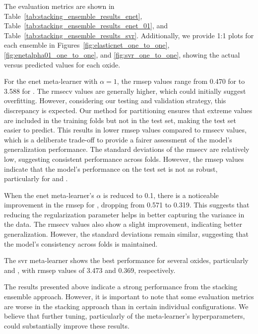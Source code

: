 The evaluation metrics are shown in Table~\ref{tab:stacking_ensemble_results_enet}, Table~\ref{tab:stacking_ensemble_results_enet_01}, and Table~\ref{tab:stacking_ensemble_results_svr}.
Additionally, we provide 1:1 plots for each ensemble in Figures~\ref{fig:elasticnet_one_to_one}, \ref{fig:enetalpha01_one_to_one}, and \ref{fig:svr_one_to_one}, showing the actual versus predicted values for each oxide.

For the \gls{enet} meta-learner with $\alpha = 1$, the \gls{rmsep} values range from 0.470 for  to 3.588 for .
The \gls{rmsecv} values are generally higher, which could initially suggest overfitting.
However, considering our testing and validation strategy, this discrepancy is expected.
Our method for partitioning ensures that extreme values are included in the training folds but not in the test set, making the test set easier to predict.
This results in lower \gls{rmsep} values compared to \gls{rmsecv} values, which is a deliberate trade-off to provide a fairer assessment of the model's generalization performance.
The standard deviations of the \gls{rmsecv} are relatively low, suggesting consistent performance across folds.
However, the \gls{rmsep} values indicate that the model's performance on the test set is not as robust, particularly for  and .

When the \gls{enet} meta-learner's $\alpha$ is reduced to 0.1, there is a noticeable improvement in the \gls{rmsep} for , dropping from 0.571 to 0.319.
This suggests that reducing the regularization parameter helps in better capturing the variance in the data.
The \gls{rmsecv} values also show a slight improvement, indicating better generalization.
However, the standard deviations remain similar, suggesting that the model's consistency across folds is maintained.

The \gls{svr} meta-learner shows the best performance for several oxides, particularly  and , with \gls{rmsep} values of 3.473 and 0.369, respectively.

The results presented above indicate a strong performance from the stacking ensemble approach.
However, it is important to note that some evaluation metrics are worse in the stacking approach than in certain individual configurations.
We believe that further tuning, particularly of the meta-learner's hyperparameters, could substantially improve these results.

